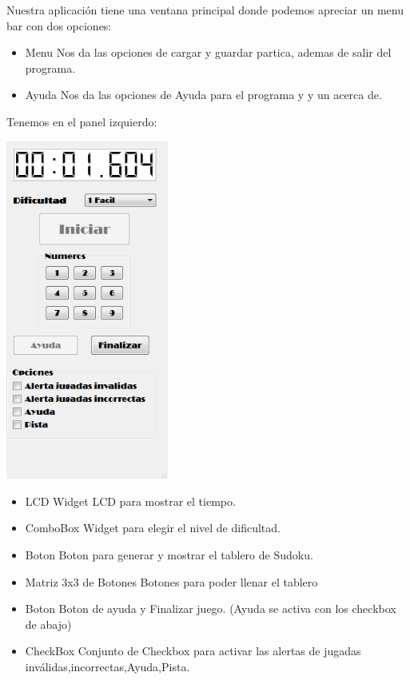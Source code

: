 \documentclass[12pt,oneside]{book}
\begin{document}
\begin{center}
	Nuestra aplicación tiene una ventana principal donde podemos apreciar un menu bar con dos opciones:
		\begin{itemize}
			\item Menu 
			Nos da las opciones de cargar y guardar partica, ademas de salir del programa.
			\item Ayuda
			Nos da las opciones de Ayuda para el programa y y un acerca de.
			\end {itemize}
	Tenemos en el panel izquierdo:

	\includegraphics[width=0.4\textwidth]{./imagenes/Panel_izquierdo.png}
		\begin{itemize}

			\item LCD
			Widget LCD para mostrar el tiempo. 
			\item ComboBox
			Widget para elegir el nivel de dificultad.
			\item Boton
			Boton para generar y mostrar el tablero de Sudoku.
			\item Matriz 3x3 de Botones
			Botones para poder llenar el tablero
			\item Boton
			Boton de ayuda y Finalizar juego. (Ayuda se activa con los checkbox de abajo)
			\item CheckBox
			Conjunto de Checkbox para activar las alertas de jugadas inválidas,incorrectas,Ayuda,Pista.
			\end {itemize}
	

\end{center}
\end{document}
